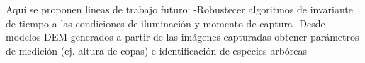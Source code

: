 Aquí se proponen lineas de trabajo futuro:
-Robustecer algoritmos de invariante de tiempo a las condiciones de iluminación y momento de captura
-Desde modelos DEM generados a partir de las imágenes capturadas obtener parámetros de medición (ej. altura de copas) e identificación de especies arbóreas